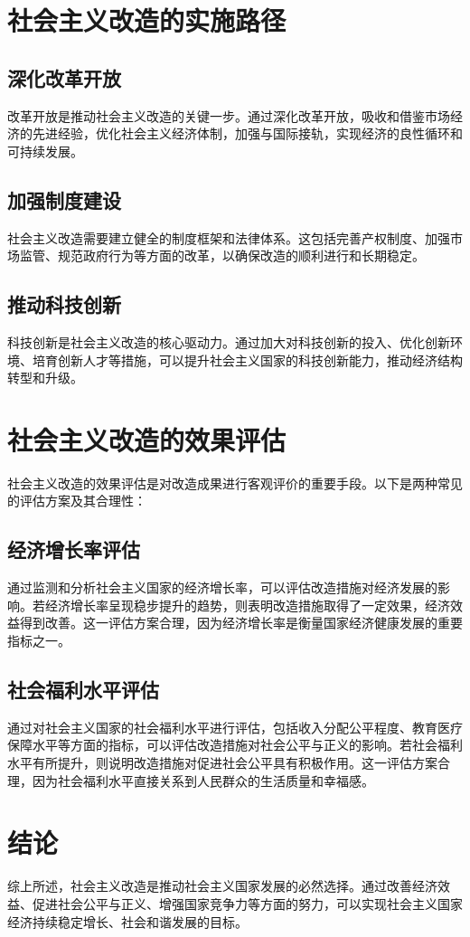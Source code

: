 \documentclass{article}
\begin{document}
\begin{CJK*}{UTF8}{gbsn}
  \section{社会主义改造的实施路径}
  \subsection{深化改革开放}
  改革开放是推动社会主义改造的关键一步。通过深化改革开放，吸收和借鉴市场经济的先进经验，优化社会主义经济体制，加强与国际接轨，实现经济的良性循环和可持续发展。

  \subsection{加强制度建设}
  社会主义改造需要建立健全的制度框架和法律体系。这包括完善产权制度、加强市场监管、规范政府行为等方面的改革，以确保改造的顺利进行和长期稳定。

  \subsection{推动科技创新}
  科技创新是社会主义改造的核心驱动力。通过加大对科技创新的投入、优化创新环境、培育创新人才等措施，可以提升社会主义国家的科技创新能力，推动经济结构转型和升级。

  \section{社会主义改造的效果评估}
  社会主义改造的效果评估是对改造成果进行客观评价的重要手段。以下是两种常见的评估方案及其合理性：

  \subsection{经济增长率评估}
  通过监测和分析社会主义国家的经济增长率，可以评估改造措施对经济发展的影响。若经济增长率呈现稳步提升的趋势，则表明改造措施取得了一定效果，经济效益得到改善。这一评估方案合理，因为经济增长率是衡量国家经济健康发展的重要指标之一。

  \subsection{社会福利水平评估}
  通过对社会主义国家的社会福利水平进行评估，包括收入分配公平程度、教育医疗保障水平等方面的指标，可以评估改造措施对社会公平与正义的影响。若社会福利水平有所提升，则说明改造措施对促进社会公平具有积极作用。这一评估方案合理，因为社会福利水平直接关系到人民群众的生活质量和幸福感。

  \section{结论}
  综上所述，社会主义改造是推动社会主义国家发展的必然选择。通过改善经济效益、促进社会公平与正义、增强国家竞争力等方面的努力，可以实现社会主义国家经济持续稳定增长、社会和谐发展的目标。

\end{CJK*}
\end{document}
